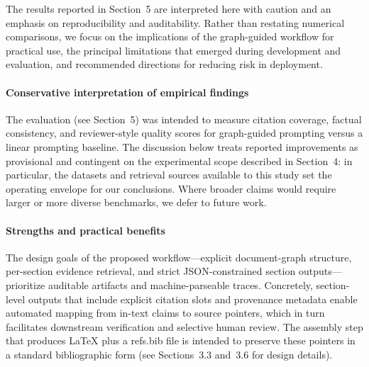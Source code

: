 The results reported in Section~5 are interpreted here with caution and an emphasis on reproducibility and auditability. Rather than restating numerical comparisons, we focus on the implications of the graph-guided workflow for practical use, the principal limitations that emerged during development and evaluation, and recommended directions for reducing risk in deployment.

\paragraph{Conservative interpretation of empirical findings}
The evaluation (see Section~5) was intended to measure citation coverage, factual consistency, and reviewer-style quality scores for graph-guided prompting versus a linear prompting baseline. The discussion below treats reported improvements as provisional and contingent on the experimental scope described in Section~4: in particular, the datasets and retrieval sources available to this study set the operating envelope for our conclusions. Where broader claims would require larger or more diverse benchmarks, we defer to future work.

\paragraph{Strengths and practical benefits}
The design goals of the proposed workflow—explicit document-graph structure, per-section evidence retrieval, and strict JSON-constrained section outputs—prioritize auditable artifacts and machine-parseable traces. Concretely, section-level outputs that include explicit citation slots and provenance metadata enable automated mapping from in-text claims to source pointers, which in turn facilitates downstream verification and selective human review. The assembly step that produces LaTeX plus a refs.bib file is intended to preserve these pointers in a standard bibliographic form (see Sections~3.3 and~3.6 for design details).

